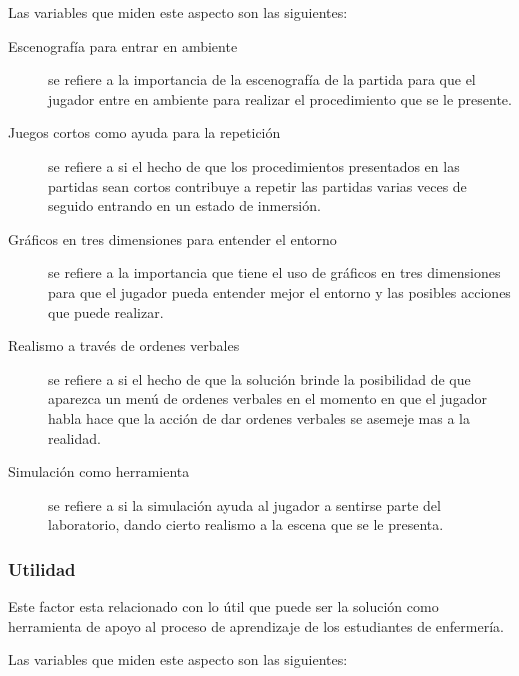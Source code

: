 Las variables que miden este aspecto son las siguientes:

\begin{description}

\item[Escenografía para entrar en ambiente] se refiere a la importancia de la
    escenografía de la partida para que el jugador entre en ambiente para
    realizar el procedimiento que se le presente.

\item[Juegos cortos como ayuda para la repetición] se refiere a si el hecho de
    que los procedimientos presentados en las partidas sean cortos contribuye a
    repetir las partidas varias veces de seguido entrando en un estado de
    inmersión.

\item[Gráficos en tres dimensiones para entender el entorno] se refiere a la
    importancia que tiene el uso de gráficos en tres dimensiones para que el
    jugador pueda entender mejor el entorno y las posibles acciones que puede
    realizar.

\item[Realismo a través de ordenes verbales] se refiere a si el hecho de que la
    solución brinde la posibilidad de que aparezca un menú de ordenes verbales
    en el momento en que el jugador habla hace que la acción de dar ordenes
    verbales se asemeje mas a la realidad.

\item[Simulación como herramienta] se refiere a si la simulación ayuda al
    jugador a sentirse parte del laboratorio, dando cierto realismo a la escena
    que se le presenta.

\end{description}

\subsubsection{Utilidad}

Este factor esta relacionado con lo útil que puede ser la solución como
herramienta de apoyo al proceso de aprendizaje de los estudiantes de enfermería.

Las variables que miden este aspecto son las siguientes:

